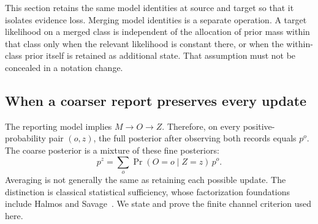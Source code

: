 \documentclass[11pt,letterpaper]{article}
\theoremstyle{plain}
\theoremstyle{definition}
\begin{document}
This section retains the same model identities at source and target so that it isolates evidence loss. Merging model identities is a separate operation. A target likelihood on a merged class is independent of the allocation of prior mass within that class only when the relevant likelihood is constant there, or when the within-class prior itself is retained as additional state. That assumption must not be concealed in a notation change.

\subsection{When a coarser report preserves every update}
The reporting model implies $M\to O\to Z$. Therefore, on every positive-probability pair $(o,z)$, the full posterior after observing both records equals $p^o$. The coarse posterior is a mixture of these fine posteriors:
\begin{equation}\label{eq:posterior-mixture}
p^z=\sum_o\Pr(O=o\mid Z=z)\,p^o.
\end{equation}
Averaging is not generally the same as retaining each possible update. The distinction is classical statistical sufficiency, whose factorization foundations include Halmos and Savage~\cite{halmos}. We state and prove the finite channel criterion used here.
\end{document}
